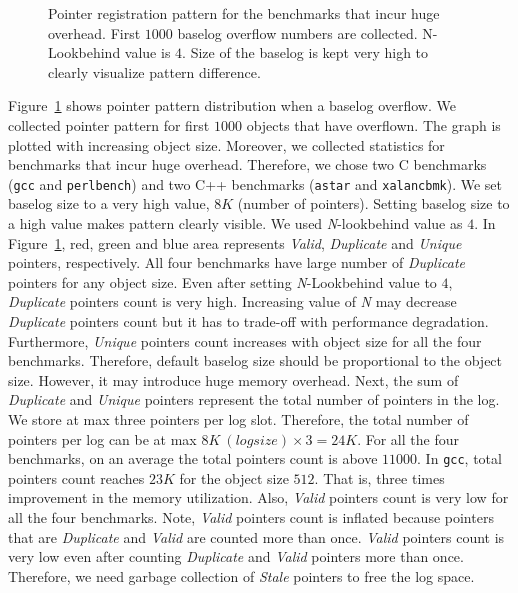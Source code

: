 \begin{figure}[t]
  \caption{Pointer registration pattern for the benchmarks that incur huge overhead. First $1000$ baselog overflow numbers are collected. N-Lookbehind value is $4$. Size of the baselog is kept very high to clearly visualize pattern difference.}
  \label{fig:pointerpattern}
  \vspace{-1em}
\end{figure} 

Figure~\ref{fig:pointerpattern} shows pointer pattern distribution when a baselog overflow. We collected pointer pattern for first $1000$ objects that have overflown. The graph is plotted with increasing object size. Moreover, we collected statistics for benchmarks that incur huge overhead. Therefore, we chose two C benchmarks (\texttt{gcc} and \texttt{perlbench}) and two C++ benchmarks (\texttt{astar} and \texttt{xalancbmk}). We set baselog size to a very high value, $8K$ (number of pointers). Setting baselog size to a high value makes pattern clearly visible. We used \emph{N}-lookbehind value as $4$. In Figure~\ref{fig:pointerpattern}, red, green and blue area represents \textit{Valid}, \textit{Duplicate} and \textit{Unique} pointers, respectively. All four benchmarks have large number of \textit{Duplicate} pointers for any object size. Even after setting \emph{N}-Lookbehind value to $4$, \textit{Duplicate} pointers count is very high. Increasing value of \emph{N} may decrease \textit{Duplicate} pointers count but it has to trade-off with performance degradation. Furthermore, \emph{Unique} pointers count increases with object size for all the four benchmarks. Therefore, default baselog size should be proportional to the object size. However, it may introduce huge memory overhead. Next, the sum of \textit{Duplicate} and \textit{Unique} pointers represent the total number of pointers in the log. We store at max three pointers per log slot. Therefore, the total number of pointers per log can be at max $8K\ (log size) \times 3 = 24K$. For all the four benchmarks, on an average the total pointers count is above $11000$. In \texttt{gcc}, total pointers count reaches $23K$ for the object size $512$. That is, three times improvement in the memory utilization. Also, \textit{Valid} pointers count is very low for all the four benchmarks. Note, \textit{Valid} pointers count is inflated because pointers that are \textit{Duplicate} and \textit{Valid} are counted more than once. \textit{Valid} pointers count is very low even after counting \textit{Duplicate} and \textit{Valid} pointers more than once. Therefore, we need garbage collection of \textit{Stale} pointers to free the log space. \\

